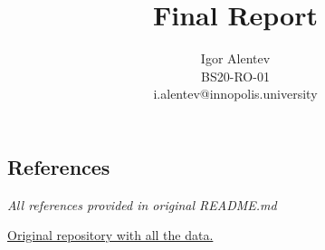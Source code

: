 \documentclass{article}
\author{Igor Alentev \\ BS20-RO-01 \\ i.alentev@innopolis.university}
\title{Final Report}
\date{}
\begin{document}
\maketitle

\newpage
\begin{multicols*}{2}
    
    
    
    
    

    \section{References}
    \textit{All references provided in original README.md}

    \href{https://github.com/m8dotpie/pmldl-detox.prj}{Original repository with all the data.}
\end{multicols*}
\end{document}
